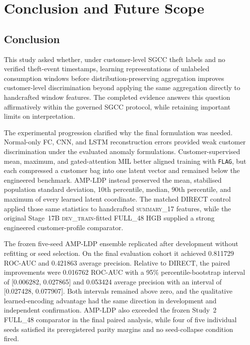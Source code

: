 \section{Conclusion and Future Scope}\label{sec:conclusion}

\subsection{Conclusion}

This study asked whether, under customer-level SGCC theft labels and no verified theft-event timestamps, learning representations of unlabeled consumption windows before distribution-preserving aggregation improves customer-level discrimination beyond applying the same aggregation directly to handcrafted window features. The completed evidence answers this question affirmatively within the governed SGCC protocol, while retaining important limits on interpretation.

The experimental progression clarified why the final formulation was needed. Normal-only FC, CNN, and LSTM reconstruction errors provided weak customer discrimination under the evaluated anomaly formulations. Customer-supervised mean, maximum, and gated-attention MIL better aligned training with \texttt{FLAG}, but each compressed a customer bag into one latent vector and remained below the engineered benchmark. AMP-LDP instead preserved the mean, stabilised population standard deviation, 10th percentile, median, 90th percentile, and maximum of every learned latent coordinate. The matched DIRECT control applied those same statistics to handcrafted \textsc{summary\_17} features, while the original Stage~17B \textsc{dev\_train}-fitted FULL\_48 HGB supplied a strong engineered customer-profile comparator.

The frozen five-seed AMP-LDP ensemble replicated after development without refitting or seed selection. On the final evaluation cohort it achieved 0.811729 ROC-AUC and 0.421863 average precision. Relative to DIRECT, the paired improvements were 0.016762 ROC-AUC with a 95\% percentile-bootstrap interval of [0.006282, 0.027865] and 0.053424 average precision with an interval of [0.027428, 0.077907]. Both intervals remained above zero, and the qualitative learned-encoding advantage had the same direction in development and independent confirmation. AMP-LDP also exceeded the frozen Study~2 FULL\_48 comparator in the final paired analysis, while four of five individual seeds satisfied its preregistered parity margins and no seed-collapse condition fired.

